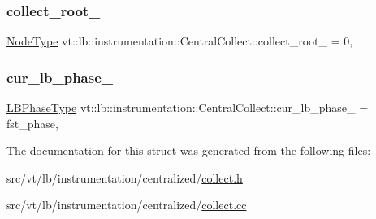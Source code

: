 \subsubsection{\texorpdfstring{collect\+\_\+root\+\_\+}{collect\_root\_}}
{\footnotesize\ttfamily \hyperlink{namespacevt_a866da9d0efc19c0a1ce79e9e492f47e2}{Node\+Type} vt\+::lb\+::instrumentation\+::\+Central\+Collect\+::collect\+\_\+root\+\_\+ = 0\hspace{0.3cm}{\ttfamily [static]}, {\ttfamily [private]}}

\mbox{\label{structvt_1_1lb_1_1instrumentation_1_1_central_collect_a7bf1388c3c36830e325a2de49c51d903}} 
\subsubsection{\texorpdfstring{cur\+\_\+lb\+\_\+phase\+\_\+}{cur\_lb\_phase\_}}
{\footnotesize\ttfamily \hyperlink{namespacevt_a5505d0bab25ce2ff566a8e015871b379}{L\+B\+Phase\+Type} vt\+::lb\+::instrumentation\+::\+Central\+Collect\+::cur\+\_\+lb\+\_\+phase\+\_\+ = fst\+\_\+phase\hspace{0.3cm}{\ttfamily [static]}, {\ttfamily [private]}}



The documentation for this struct was generated from the following files\+:\begin{DoxyCompactItemize}
\item 
src/vt/lb/instrumentation/centralized/\hyperlink{collect_8h}{collect.\+h}\item 
src/vt/lb/instrumentation/centralized/\hyperlink{collect_8cc}{collect.\+cc}\end{DoxyCompactItemize}
